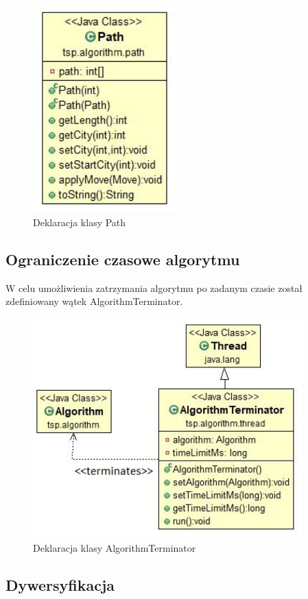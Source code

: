 \documentclass[a4paper,11pt]{article}
\begin{document}
\begin{figure}[H]
\centering
\includegraphics[height=8cm]{ClassPath.JPG}
\caption{Deklaracja klasy Path}
\end{figure}

\subsection{Ograniczenie czasowe algorytmu}

W celu umożliwienia zatrzymania algorytmu po zadanym czasie został zdefiniowany wątek AlgorithmTerminator.

\begin{figure}[H]
\centering
\includegraphics[height=8.5cm]{ClassAlgorithmTerminator.JPG}
\caption{Deklaracja klasy AlgorithmTerminator}
\end{figure}

\newpage
\subsection{Dywersyfikacja}
\end{document}
